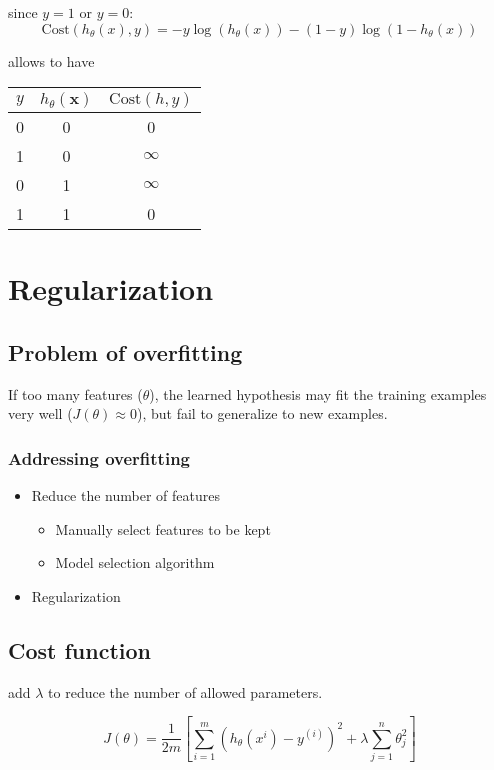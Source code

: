 \documentclass[a4paper,titlepage] {scrartcl}
\begin{document}
since $y=1$ or $y=0$:
\begin{equation}
	\text{Cost}(h_\theta(x),y) = -y\log{(h_\theta(x))} - (1-y)\log{(1-h_\theta(x))}
\end{equation}

allows to have
\begin{tabular}{ccc}
\hline
$y$ & $h_\theta(\mathbf{x})$ & $\text{Cost}(h,y)$\\
\hline
0 & 0 & 0\\
\hline
1 & 0 & $\infty$\\
\hline
0 & 1 & $\infty$\\
\hline
1 & 1 & 0\\
\hline
\end{tabular}

\section{Regularization}
\subsection{Problem of overfitting}
If too many features ($\theta$), the learned hypothesis may fit the training examples very well ($J(\theta)\approx0$), but fail to generalize to new examples.

\subsubsection{Addressing overfitting}
\begin{itemize}
	\item Reduce the number of features
	\begin{itemize}
		\item Manually select features to be kept
		\item Model selection algorithm
	\end{itemize}
	\item Regularization
\end{itemize}


\subsection{Cost function}

add $\lambda$ to reduce the number of allowed parameters.

\begin{equation}
	J(\theta) = \frac{1}{2m}\left[\sum_{i=1}^m(h_\theta(x^{i})-y^{(i)})^2 + \lambda\sum_{j=1}^n\theta_j^2\right]
\end{equation}
\end{document}
